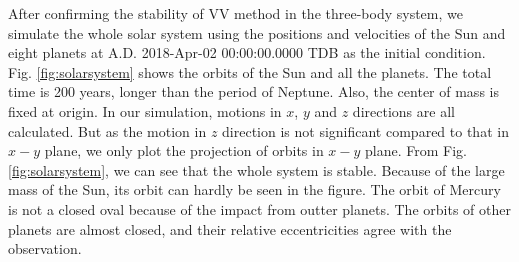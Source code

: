 After confirming the stability of VV method in the three-body system, 
we simulate the whole solar system using the positions and velocities of the Sun and eight planets 
at A.D. 2018-Apr-02 00:00:00.0000 TDB \cite{NASAdata} as the initial condition. 
Fig. \ref{fig:solarsystem} shows the orbits of the Sun and all the planets. 
The total time is 200 years, longer than the period of Neptune. 
Also, the center of mass is fixed at origin. 
In our simulation, motions in $x$, $y$ and $z$ directions are all calculated. 
But as the motion in $z$ direction is not significant compared to that in $x-y$ plane, 
we only plot the projection of orbits in $x-y$ plane. 
From Fig. \ref{fig:solarsystem}, we can see that the whole system is stable. 
Because of the large mass of the Sun, its orbit can hardly be seen in the figure. 
The orbit of Mercury is not a closed oval because of the impact from outter planets. 
The orbits of other planets are almost closed, and their relative eccentricities agree with the observation. 
